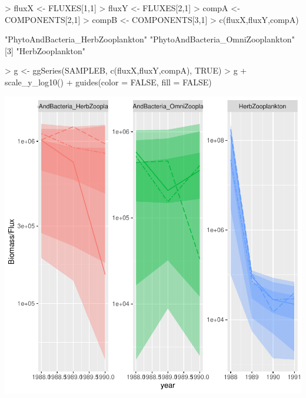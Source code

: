 \documentclass{article}
\begin{document}
\begin{Schunk}
\begin{Sinput}
> fluxX <- FLUXES[1,1]
> fluxY <- FLUXES[2,1]
> compA <- COMPONENTS[2,1] 
> compB <- COMPONENTS[3,1] 
> c(fluxX,fluxY,compA)
\end{Sinput}
\begin{Soutput}
[1] "PhytoAndBacteria_HerbZooplankton" "PhytoAndBacteria_OmniZooplankton"
[3] "HerbZooplankton"                 
\end{Soutput}
\begin{Sinput}
> g <- ggSeries(SAMPLEB, c(fluxX,fluxY,compA), TRUE)
> g + scale_y_log10() + guides(color = FALSE, fill = FALSE)
\end{Sinput}
\end{Schunk}
\includegraphics{barents_SM-026}
\end{document}
